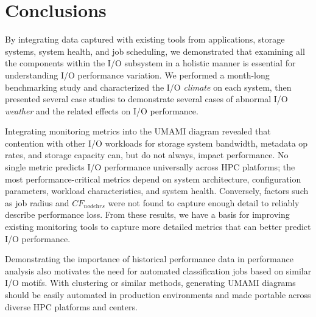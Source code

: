 \section{Conclusions} \label{sec:conclusions}

By integrating data captured with existing tools from applications, storage systems, system health, and job scheduling, we demonstrated that examining all the components within the I/O subsystem in a holistic manner is essential for understanding I/O performance variation.
We performed a month-long benchmarking study and characterized the I/O \emph{climate} on each system, then presented several case studies to demonstrate several cases of abnormal I/O \emph{weather} and the related effects on I/O performance.

Integrating monitoring metrics into the UMAMI diagram revealed that contention with other I/O workloads for storage system bandwidth, metadata op rates, and storage capacity can, but do not always, impact performance.
No single metric predicts I/O performance universally across HPC platforms;
the most performance-critical metrics depend on system architecture, configuration parameters, workload characteristics, and system health.
Conversely, factors such as job radius and $\textit{CF}_{\textit{nodehrs}}$ were not found to capture enough detail to reliably describe performance loss.
From these results, we have a basis for improving existing monitoring tools to capture more detailed metrics that can better predict I/O performance.

Demonstrating the importance of historical performance data in performance analysis also motivates the need for automated classification jobs based on similar I/O motifs.  With  clustering or similar methods, generating UMAMI diagrams should be easily automated in production environments and made portable across diverse HPC platforms and centers.

%
